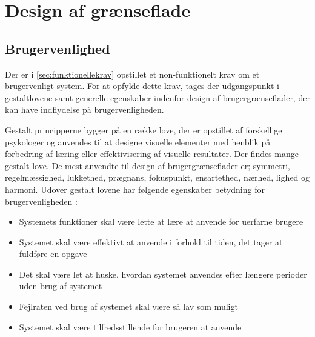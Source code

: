 \section{Design af grænseflade}

\subsection{Brugervenlighed}
Der er i \autoref{sec:funktionellekrav} opstillet et non-funktionelt krav om et brugervenligt system. For at opfylde dette krav, tages der udgangspunkt i gestaltlovene samt generelle egenskaber indenfor design af brugergrænseflader, der kan have indflydelse på brugervenligheden. 

Gestalt principperne bygger på en række love, der er opstillet af forskellige psykologer og anvendes til at designe visuelle elementer med henblik på forbedring af læring eller effektivisering af visuelle resultater. Der findes mange gestalt love. De mest anvendte til design af brugergrænseflader er; symmetri, regelmæssighed, lukkethed, prægnans, fokuspunkt, ensartethed, nærhed, lighed og harmoni.\cite{Chang2002} Udover gestalt lovene har følgende egenskaber betydning for brugervenligheden \cite{ferre2001}:
\begin{itemize}
\item Systemets funktioner skal være lette at lære at anvende for uerfarne brugere
\item Systemet skal være effektivt at anvende i forhold til tiden, det tager at fuldføre en opgave
\item Det skal være let at huske, hvordan systemet anvendes efter længere perioder uden brug af systemet
\item Fejlraten ved brug af systemet skal være så lav som muligt
\item Systemet skal være tilfredsstillende for brugeren at anvende
\end{itemize}
 
 
